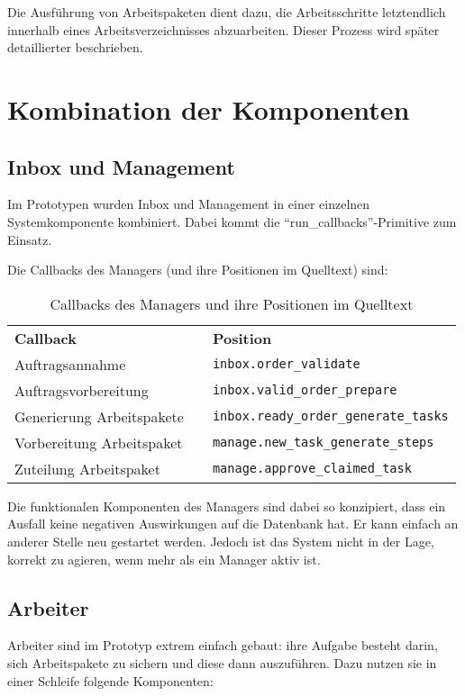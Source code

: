 Die Ausführung von Arbeitspaketen dient dazu,
die Arbeitsschritte letztendlich innerhalb eines Arbeitsverzeichnisses abzuarbeiten.
Dieser Prozess wird später detaillierter beschrieben.


\section{Kombination der Komponenten}
\subsection{Inbox und Management}

Im Prototypen wurden Inbox und Management in einer einzelnen Systemkomponente  kombiniert.
Dabei kommt die ``run\_callbacks''-Primitive zum Einsatz.

Die Callbacks des Managers (und ihre Positionen im Quelltext) sind:
\begin{table}[h]
\begin{tabular}{lcl}
    \textbf{Callback} && \textbf{Position} \\
    Auftragsannahme && \verb|inbox.order_validate| \\
    Auftragsvorbereitung && \verb|inbox.valid_order_prepare| \\
    Generierung Arbeitspakete && \verb|inbox.ready_order_generate_tasks| \\
    Vorbereitung Arbeitspaket && \verb|manage.new_task_generate_steps| \\
    Zuteilung Arbeitspaket && \verb|manage.approve_claimed_task| \\
\end{tabular}
\caption{Callbacks des Managers und ihre Positionen im Quelltext}
\label{tab:callbacks-manager}
\end{table}

Die funktionalen Komponenten des Managers sind dabei so konzipiert,
dass ein Ausfall keine negativen Auswirkungen auf die Datenbank hat.
Er kann einfach an anderer Stelle neu gestartet werden.
Jedoch ist das System nicht in der Lage, korrekt zu agieren, wenn mehr als ein Manager aktiv ist.

\subsection{Arbeiter}

Arbeiter sind im Prototyp extrem einfach gebaut:
ihre Aufgabe besteht darin, sich Arbeitspakete zu sichern
und diese dann auszuführen.
Dazu nutzen sie in einer Schleife folgende Komponenten:

